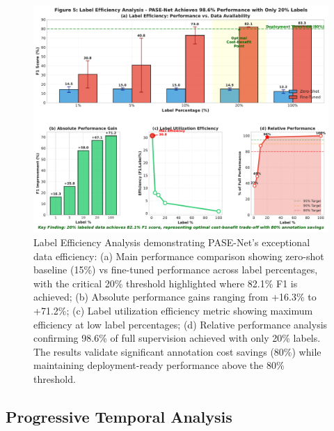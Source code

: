 \documentclass[lettersize,journal]{IEEEtran}
\begin{document}
\begin{figure}[t]
\centering
\includegraphics[width=\linewidth]{plots/fig5_label_efficiency.pdf}
\caption{Label Efficiency Analysis demonstrating PASE-Net's exceptional data efficiency: (a) Main performance comparison showing zero-shot baseline (15\%) vs fine-tuned performance across label percentages, with the critical 20\% threshold highlighted where 82.1\% F1 is achieved; (b) Absolute performance gains ranging from +16.3\% to +71.2\%; (c) Label utilization efficiency metric showing maximum efficiency at low label percentages; (d) Relative performance analysis confirming 98.6\% of full supervision achieved with only 20\% labels. The results validate significant annotation cost savings (80\%) while maintaining deployment-ready performance above the 80\% threshold.}
\label{fig:label_efficiency}
\end{figure}


\subsection{Progressive Temporal Analysis}
\end{document}
